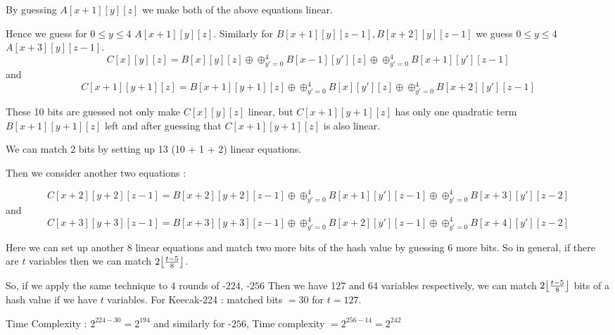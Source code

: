 	By guessing $A[x+1][y][z]$ we make both of the above equations linear.
	
	Hence we guess for $0 \leq y \leq 4$ $A[x+1][y][z]$. Similarly for $B[x+1][y][z-1], B[x+2][y][z-1]$ we guess $0 \leq y \leq 4$ $A[x+3][y][z-1]$. 
	\[
        C[x][y][z] = B[x][y][z] \oplus \oplus_{y' = 0}^{4} B[x-1][y'][z] \oplus \oplus_{y' = 0}^{4} B[x+1][y'][z-1]
    \] and 
	\[
        C[x+1][y+1][z] = B[x+1][y+1][z] \oplus \oplus_{y' = 0}^{4} B[x][y'][z] \oplus \oplus_{y' = 0}^{4} B[x+2][y'][z-1]
    \]

    These 10 bits are guessed not only make $C[x][y][z]$ linear, but $C[x+1][y+1][z]$ has only one quadratic term $B[x+1][y+1][z]$ left and after guessing that $C[x+1][y+1][z]$ is also linear. 
    
    We can match 2 bits by setting up 13 (10 + 1 + 2) linear equations. 
    
    Then we consider another two equations :
    
    	\[
        C[x + 2][y+2][z-1] = B[x + 2][y+2][z-1] \oplus \oplus_{y' = 0}^{4} B[x+1][y'][z-1] \oplus \oplus_{y' = 0}^{4} B[x+3][y'][z-2]
    \] and 
		\[
        C[x+3][y+3][z-1] = B[x+3][y+3][z-1] \oplus \oplus_{y' = 0}^{4} B[x+2][y'][z-1] \oplus \oplus_{y' = 0}^{4} B[x+4][y'][z-2]
    \]
    
    Here we can set up another 8 linear equations and match two more bits of the hash value by guessing 6 more bits. So in general, if there are $t$ variables then we can match $2\floor*{\frac{t-5}{8}}$.
    
    So, if we apply the same technique to 4 rounds of \KECCAK-$224$, \KECCAK-$256$
    Then we have 127 and 64 variables respectively, we can match $2\floor*{\frac{t-5}{8}}$ bits of a hash value if we have $t$ variables.
    For Keecak-224 : matched bits $= 30$ for $t = 127$.
    
    Time Complexity : $2^{224 - 30} = 2^{194}$ and similarly for \KECCAK-$256$, Time complexity $=2^{256 - 14} = 2^{242}$

